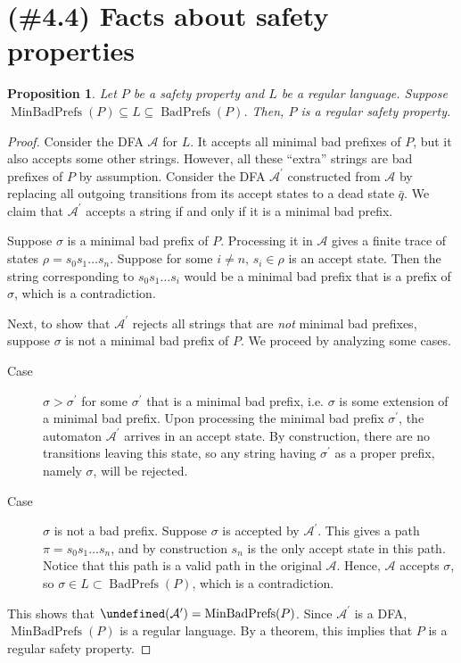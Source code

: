 \documentclass[letterpaper,11pt]{article}
\newtheorem{prop}{Proposition}
\DeclareMathOperator{\MBP}{MinBadPrefs}
\DeclareMathOperator{\BP}{BadPrefs}
\let\L\undefined
\DeclareMathOperator{\L}{\mathcal{L}}
\begin{document}
\section{(\#4.4) Facts about safety properties}

\begin{prop}
    Let $P$ be a safety property and $L$ be a regular language. Suppose
    $\MBP(P) \subseteq L \subseteq \BP(P)$. Then, $P$ is a regular safety
    property.
\end{prop}

\begin{proof}
    Consider the DFA $\mathcal{A}$ for $L$. It accepts all minimal bad prefixes
    of $P$, but it also accepts some other strings. However, all these
    ``extra'' strings are bad prefixes of $P$ by assumption. Consider the DFA
    $\mathcal{A}^\prime$ constructed from $\mathcal{A}$ by replacing all
    outgoing transitions from its accept states to a dead state $\bar q$.
    We claim that $\mathcal{A}^\prime$ accepts a string if and only if it is a
    minimal bad prefix.

    Suppose $\sigma$ is a minimal bad prefix of $P$. Processing it in
    $\mathcal{A}$ gives a finite trace of states $\rho = s_0 s_1 \ldots s_n$.
    Suppose for some $i \neq n$, $s_i \in \rho$ is an accept state. Then the
    string corresponding to $s_0 s_1 \ldots s_i$ would be a minimal bad prefix
    that is a prefix of $\sigma$, which is a contradiction.

    Next, to show that $\mathcal{A}^\prime$ rejects all strings that are
    \emph{not} minimal bad prefixes, suppose $\sigma$ is not a minimal bad
    prefix of $P$.  We proceed by analyzing some cases.
    \begin{description}
        \item[Case] $\sigma > \sigma^\prime$ for some $\sigma^\prime$ that is a
            minimal bad prefix, i.e. $\sigma$ is some extension of a minimal
            bad prefix.
            Upon processing the minimal bad prefix $\sigma^\prime$, the
            automaton $\mathcal{A}^\prime$ arrives in an accept state. By
            construction, there are no transitions leaving this state, so any
            string having $\sigma^\prime$ as a proper prefix, namely $\sigma$,
            will be rejected.

        \item[Case] $\sigma$ is not a bad prefix. Suppose $\sigma$ is accepted
            by $\mathcal{A}^\prime$. This gives a path
            $\pi = s_0 s_1 \ldots s_n$, and by construction $s_n$ is the only
            accept state in this path. Notice that this path is a valid path in
            the original $\mathcal{A}$. Hence, $\mathcal{A}$ accepts $\sigma$,
            so $\sigma \in L \subset \BP(P)$, which is a contradiction.
    \end{description}

    This shows that $\L(\mathcal{A}^\prime) = \MBP(P)$. Since
    $\mathcal{A}^\prime$ is a DFA, $\MBP(P)$ is a regular language. By a
    theorem, this implies that $P$ is a regular safety property.
\end{proof}
\end{document}
